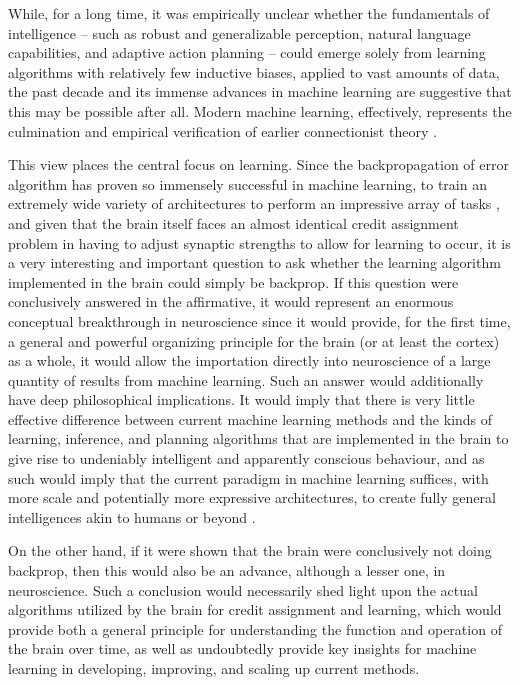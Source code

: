 While, for a long time, it was empirically unclear whether the fundamentals of intelligence -- such as robust and generalizable perception, natural language capabilities, and adaptive action planning -- could emerge solely from learning algorithms with relatively few inductive biases, applied to vast amounts of data, the past decade and its immense advances in machine learning are suggestive that this may be possible after all. Modern machine learning, effectively, represents the culmination and empirical verification of earlier connectionist theory \citep{rumelhart1986learning}.

This view places the central focus on learning. Since the backpropagation of error algorithm has proven so immensely successful in machine learning, to train an extremely wide variety of architectures to perform an impressive array of tasks \citep{krizhevsky2012imagenet,goodfellow2014generative,radford2019language,schrittwieser2019mastering,schmidhuber1999artificial}, and given that the brain itself faces an almost identical credit assignment problem in having to adjust synaptic strengths to allow for learning to occur, it is a very interesting and important question to ask whether the learning algorithm implemented in the brain could simply be backprop. If this question were conclusively answered in the affirmative, it would represent an enormous conceptual breakthrough in neuroscience since it would provide, for the first time, a general and powerful organizing principle for the brain (or at least the cortex) as a whole, it would allow the importation directly into neuroscience of a large quantity of results from machine learning. Such an answer would additionally have deep philosophical implications. It would imply that there is very little effective difference between current machine learning methods and the kinds of learning, inference, and planning algorithms that are implemented in the brain to give rise to undeniably intelligent and apparently conscious behaviour, and as such would imply that the current paradigm in machine learning suffices, with more scale and potentially more expressive architectures, to create fully general intelligences akin to humans or beyond \citep{bostrom2017superintelligence}.

On the other hand, if it were shown that the brain were conclusively not doing backprop, then this would also be an advance, although a lesser one, in neuroscience. Such a conclusion would necessarily shed light upon the actual algorithms utilized by the brain for credit assignment and learning, which would provide both a general principle for understanding the function and operation of the brain over time, as well as undoubtedly provide key insights for machine learning in developing, improving, and scaling up current methods. 

